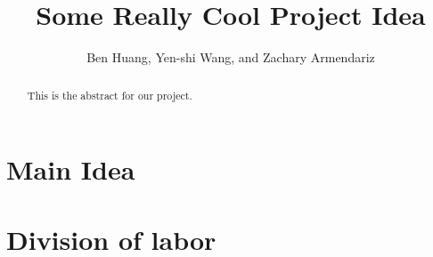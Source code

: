 \documentclass[11pt, notitlepage]{article}
\title{Some Really Cool Project Idea}
\author{Ben Huang, Yen-shi Wang, and Zachary Armendariz}
\begin{document}
\maketitle

\begin{abstract}
    This is the abstract for our project.
\end{abstract}

\section*{Main Idea}

\section*{Division of labor}
\end{document}
